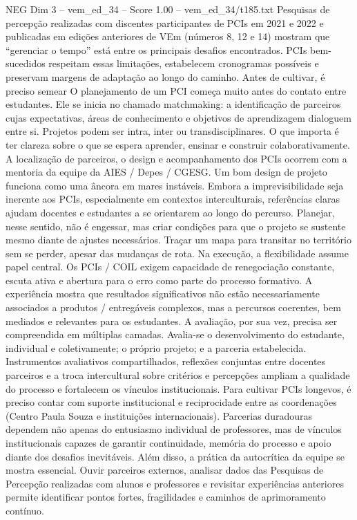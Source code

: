 \begin{textsample}{NEG Dim 3 – vem\_ed\_34 – Score 1.00 – vem\_ed\_34/t185.txt}
Pesquisas de percepção realizadas com discentes participantes de PCIs em 2021 e 2022 e publicadas em edições anteriores de VEm (números 8, 12 e 14) mostram que “gerenciar o tempo” está entre os principais desafios encontrados.
PCIs bem-sucedidos respeitam essas limitações, estabelecem cronogramas possíveis e preservam margens de adaptação ao longo do caminho.
Antes de cultivar, é preciso semear O planejamento de um PCI começa muito antes do contato entre estudantes.
Ele se inicia no chamado matchmaking: a identificação de parceiros cujas expectativas, áreas de conhecimento e objetivos de aprendizagem dialoguem entre si.
Projetos podem ser intra, inter ou transdisciplinares.
O que importa é ter clareza sobre o que se espera aprender, ensinar e construir colaborativamente.
A localização de parceiros, o design e acompanhamento dos PCIs ocorrem com a mentoria da equipe da AIES / Depes / CGESG.
Um bom design de projeto funciona como uma âncora em mares instáveis.
Embora a imprevisibilidade seja inerente aos PCIs, especialmente em contextos interculturais, referências claras ajudam docentes e estudantes a se orientarem ao longo do percurso.
Planejar, nesse sentido, não é engessar, mas criar condições para que o projeto se sustente mesmo diante de ajustes necessários.
Traçar um mapa para transitar no território sem se perder, apesar das mudanças de rota.
Na execução, a flexibilidade assume papel central.
Os PCIs / COIL exigem capacidade de renegociação constante, escuta ativa e abertura para o erro como parte do processo formativo.
A experiência mostra que resultados significativos não estão necessariamente associados a produtos / entregáveis complexos, mas a percursos coerentes, bem mediados e relevantes para os estudantes.
A avaliação, por sua vez, precisa ser compreendida em múltiplas camadas.
Avalia-se o desenvolvimento do estudante, individual e coletivamente; o próprio projeto; e a parceria estabelecida.
Instrumentos avaliativos compartilhados, reflexões conjuntas entre docentes parceiros e a troca intercultural sobre critérios e percepções ampliam a qualidade do processo e fortalecem os vínculos institucionais.
Para cultivar PCIs longevos, é preciso contar com suporte institucional e reciprocidade entre as coordenações (Centro Paula Souza e instituições internacionais).
Parcerias duradouras dependem não apenas do entusiasmo individual de professores, mas de vínculos institucionais capazes de garantir continuidade, memória do processo e apoio diante dos desafios inevitáveis.
Além disso, a prática da autocrítica da equipe se mostra essencial.
Ouvir parceiros externos, analisar dados das Pesquisas de Percepção realizadas com alunos e professores e revisitar experiências anteriores permite identificar pontos fortes, fragilidades e caminhos de aprimoramento contínuo.

\end{textsample}
